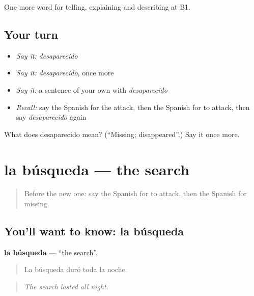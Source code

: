 \begin{grammarlens}[title={What you've built}]
One more word for telling, explaining and describing at B1.
\end{grammarlens}

\subsection*{Your turn}
\begin{itemize}
\raggedright
  \item \emph{Say it:} \emph{desaparecido}
  \item \emph{Say it:} \emph{desaparecido}, once more
  \item \emph{Say it:} a sentence of your own with \emph{desaparecido}
  \item \emph{Recall:} say the Spanish for the attack, then the Spanish for to attack, then say \emph{desaparecido} again
\end{itemize}

\begin{tcolorbox}[breakable,colback=teal!4,colframe=teal!35!black,title={Before you move on}]
What does desaparecido mean? (\textquotedblleft{}Missing; disappeared\textquotedblright{}.) Say it once more.
\end{tcolorbox}
\section[la búsqueda]{la búsqueda — the search}

\label{lesson:ES-C531-busqueda}



\begin{quote}
Before the new one: say the Spanish for to attack, then the Spanish for missing.
\end{quote}

\subsection*{You'll want to know: la búsqueda}
\textbf{la búsqueda} — \textquotedblleft{}the search\textquotedblright{}.

\begin{quote}
La búsqueda duró toda la noche.
\end{quote}

\begin{quote}
\emph{The search lasted all night.}
\end{quote}

